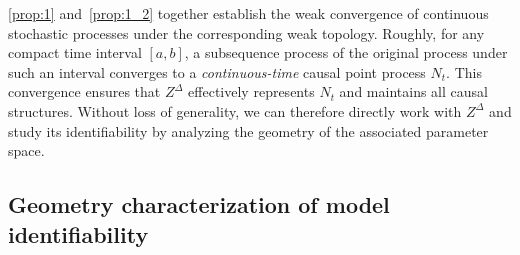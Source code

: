 \documentclass[10pt]{article}
\numberwithin{figure}{section}
\begin{document}
\autoref{prop:1} and~\ref{prop:1_2} together establish the weak convergence of continuous stochastic processes under the corresponding weak topology. Roughly, for any compact time interval $[a,b]$, a subsequence process of the original process under such an interval converges to a \textit{continuous-time} causal point process $N_t$. This convergence ensures that $Z^{\Delta}$ effectively represents $N_t$ and maintains all causal structures. Without loss of generality, we can therefore directly work with $Z^{\Delta}$ and study its identifiability by analyzing the geometry of the associated parameter space.


\subsection{Geometry characterization of model identifiability}
\end{document}
